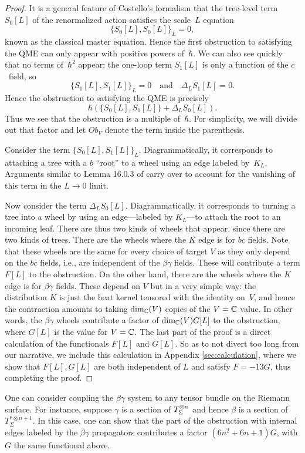 \begin{proof}
It is a general feature of Costello's formalism that the tree-level term $S_0[L]$ of the renormalized action satisfies the scale~$L$ equation
\[
\{S_0[L],S_0[L]\}_L = 0,
\]
known as the classical master equation.
Hence the first obstruction to satisfying the QME can only appear with positive powers of~$\hbar$.
We can also see quickly that no terms of~$\hbar^2$ appear:
the one-loop term $S_1[L]$ is only a function of the $c$~field, 
so 
\[
\{S_1[L],S_1[L]\}_L = 0 \quad\text{and}\quad \Delta_L S_1[L] = 0.
\]
Hence the obstruction to satisfying the QME is precisely
\[
\hbar\left( \{S_0[L],S_1[L]\} + \Delta_L S_0[L] \right).
\]
Thus we see that the obstruction is a multiple of~$\hbar$.
For simplicity, we will divide out that factor and let $Ob_V$ denote the term inside the parenthesis.

Consider the term $\{S_0[L],S_1[L]\}_L$. 
Diagrammatically, it corresponds to attaching a tree with a $b$ ``root'' to a wheel using an edge labeled by~$K_L$.
Arguments similar to Lemma 16.0.3 of \cite{wg2} carry over to account for the vanishing of this term in the $L \to 0$ limit. 


Now consider the term $\Delta_L S_0[L]$. 
Diagrammatically, it corresponds to turning a tree into a wheel by using an edge---labeled by $K_L$---to attach the root to an incoming leaf.
There are thus two kinds of wheels that appear, since there are two kinds of trees.
There are the wheels where the $K$ edge is for $bc$ fields.
Note that these wheels are the same for every choice of target $V$
as they only depend on the $bc$ fields, i.e., are independent of the $\beta\gamma$ fields.
These will contribute a term $F[L]$ to the obstruction.
On the other hand, there are the wheels where the $K$ edge is for $\beta\gamma$ fields.
These depend on $V$ but in a very simple way: 
the distribution $K$ is just the heat kernel tensored with the identity on~$V$, 
and hence the contraction amounts to taking $\dim_\mathbb C(V)$ copies of the $V = \mathbb C$ value.
In other words, the $\beta\gamma$ wheels contribute a factor of $\dim_\mathbb C(V) G[L]$ to the obstruction,
where $G[L]$ is the value for $V = \mathbb C$.
The last part of the proof is a direct calculation of the functionals $F[L]$ and $G[L]$. 
So as to not divert too long from our narrative, we include this calculation in Appendix \ref{sec:calculation}, where we show that $F[L], G[L]$ are both independent of $L$ and satisfy $F = -13 G$, thus completing the proof.
\end{proof}

\begin{rmk} 
One can consider coupling the $\beta\gamma$ system to any tensor bundle on the Riemann surface. 
For instance, suppose $\gamma$ is a section of $T_\Sigma^{\otimes n}$ and hence $\beta$ is a section of $T^{* \otimes {n+1}}_\Sigma$.
In this case, one can show that the part of the obstruction with internal edges labeled by the $\beta\gamma$ propagators contributes a factor $(6n^2 + 6n + 1)G$, with $G$ the same functional above. 
\end{rmk}





